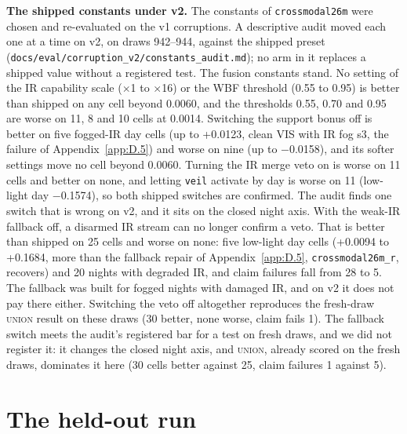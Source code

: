 \documentclass[10pt]{article}
\begin{document}
\textbf{The shipped constants under v2.} The constants of \texttt{crossmodal26m} were chosen and re-evaluated on the v1 corruptions. A descriptive audit moved each one at a time on v2, on draws 942--944, against the shipped preset (\texttt{docs/\allowbreak{}eval/\allowbreak{}corruption\_\allowbreak{}v2/\allowbreak{}constants\_\allowbreak{}audit.md}); no arm in it replaces a shipped value without a registered test. The fusion constants stand. No setting of the IR capability scale ($\times$1 to $\times$16) or the WBF threshold (0.55 to 0.95) is better than shipped on any cell beyond 0.0060, and the thresholds 0.55, 0.70 and 0.95 are worse on 11, 8 and 10 cells at 0.0014. Switching the support bonus off is better on five fogged-IR day cells (up to +0.0123, clean VIS with IR fog s3, the failure of Appendix~\ref{app:D.5}) and worse on nine (up to $-$0.0158), and its softer settings move no cell beyond 0.0060. Turning the IR merge veto on is worse on 11 cells and better on none, and letting \texttt{veil} activate by day is worse on 11 (low-light day $-$0.1574), so both shipped switches are confirmed. The audit finds one switch that is wrong on v2, and it sits on the closed night axis. With the weak-IR fallback off, a disarmed IR stream can no longer confirm a veto. That is better than shipped on 25 cells and worse on none: five low-light day cells (+0.0094 to +0.1684, more than the fallback repair of Appendix~\ref{app:D.5}, \texttt{crossmodal26m\_\allowbreak{}r}, recovers) and 20 nights with degraded IR, and claim failures fall from 28 to 5. The fallback was built for fogged nights with damaged IR, and on v2 it does not pay there either. Switching the veto off altogether reproduces the fresh-draw \textsc{union} result on these draws (30 better, none worse, claim fails 1). The fallback switch meets the audit's registered bar for a test on fresh draws, and we did not register it: it changes the closed night axis, and \textsc{union}, already scored on the fresh draws, dominates it here (30 cells better against 25, claim failures 1 against 5).

\FloatBarrier
\section{The held-out run}\label{app:G}
\end{document}
